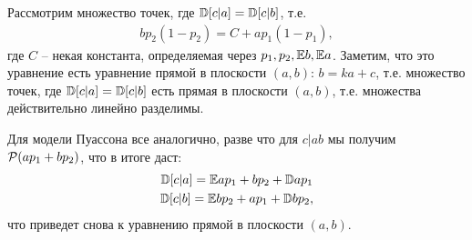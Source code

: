 Рассмотрим множество точек, где $\mathbb{D}[c|a] = \mathbb{D}[c|b]$, т.е.
\begin{gather}
    b p_2 (1 - p_2) = C + a p_1 (1 - p_1),
\end{gather}
где $C$ -- некая константа, определяемая через $p_1, p_2, \mathbb{E} b, \mathbb{E} a$.
Заметим, что это уравнение есть уравнение прямой в плоскости $(a, b)$: $b = k a + c$, т.е. множество точек, где $\mathbb{D}[c|a] = \mathbb{D}[c|b]$ есть прямая в плоскости $(a, b)$, т.е. множества действительно линейно разделимы.

Для модели Пуассона все аналогично, разве что для $c|ab$ мы получим $\mathcal{P}(ap_1 + bp_2)$, что в итоге даст:
\begin{gather}
    \mathbb{D}[c|a] = \mathbb{E} a p_1 + bp_2 + \mathbb{D} a p_1 \\
    \mathbb{D}[c|b] = \mathbb{E} b p_2 + ap_1 + \mathbb{D} b p_2,
\end{gather}
что приведет снова к уравнению прямой в плоскости $(a, b)$.
